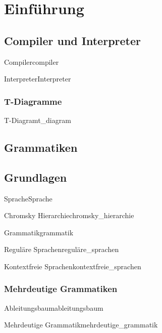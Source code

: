 \chapter{Einführung}
\section{Compiler und Interpreter}
\begin{Definition}{Compiler}{compiler}
\end{Definition}
\begin{Definition}{Interpreter}{Interpreter}
\end{Definition}
\subsection{T-Diagramme}
\begin{Definition}{T-Diagram}{t_diagram}
\end{Definition}
\section{Grammatiken}
\section{Grundlagen}
\begin{Definition}{Sprache}{Sprache}
\end{Definition}
\begin{Definition}{Chromsky Hierarchie}{chromsky_hierarchie}
\end{Definition}
\begin{Definition}{Grammatik}{grammatik}
\end{Definition}
\begin{Definition}{Reguläre Sprachen}{reguläre_sprachen}
\end{Definition}
\begin{Definition}{Kontextfreie Sprachen}{kontextfreie_sprachen}
\end{Definition}
\subsection{Mehrdeutige Grammatiken}
\begin{Definition}{Ableitungsbaum}{ableitungsbaum}
\end{Definition}
\begin{Definition}{Mehrdeutige Grammatik}{mehrdeutige_grammatik}
\end{Definition}
